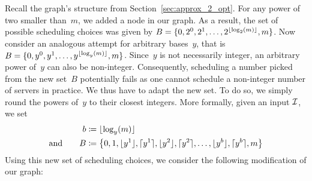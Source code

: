 Recall the graph's structure from Section~\ref{sec:approx_2_opt}. For any power of two smaller than~$m$, we added a node in our graph. As a result, the set of possible scheduling choices was given by $B=\{0,2^0,2^1,\dotsc,2^{\lfloor\log_2(m)\rfloor},m\}$. Now consider an analogous attempt for arbitrary bases~$y$, that is $B=\{0,y^0,y^1,\dotsc,y^{\lfloor\log_y(m)\rfloor},m\}$. Since~$y$ is not necessarily integer, an arbitrary power of~$y$ can also be non-integer. Consequently, scheduling a number picked from the new set~$B$ potentially fails as one cannot schedule a non-integer number of servers in practice. We thus have to adapt the new set. To do so, we simply round the powers of~$y$ to their closest integers. More formally, given an input $\mathcal{I}$, we set
\begin{align*}
	b&\coloneqq\lfloor\log_y(m)\rfloor\\
	\text{and}\qquad B&\coloneqq\left\{0,1,\lfloor y^1\rfloor,\lceil y^1\rceil,\lfloor y^2\rfloor,\lceil y^2\rceil,\dotsc,\lfloor y^b\rfloor,\lceil y^b\rceil,m\right\}
\end{align*}
Using this new set of scheduling choices, we consider the following modification of our graph:
